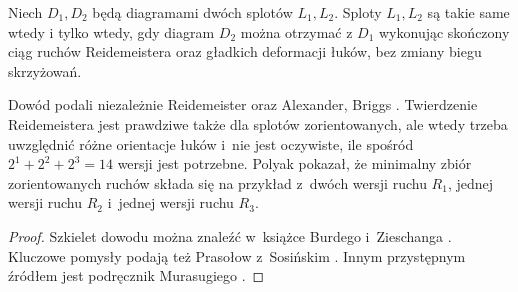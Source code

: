 \begin{theorem}[Reidemeister, 1927]
\label{thm:reidemeister}%
%
%
    Niech $D_1, D_2$ będą diagramami dwóch splotów $L_1, L_2$.
    Sploty $L_1, L_2$ są takie same wtedy i tylko wtedy, gdy diagram $D_2$ można otrzymać z $D_1$ wykonując skończony ciąg ruchów Reidemeistera oraz gładkich deformacji łuków, bez zmiany biegu skrzyżowań.
\end{theorem}

Dowód podali niezależnie Reidemeister \cite{reidemeister1927} oraz Alexander, Briggs \cite{alexander1927}.
%
%
%
Twierdzenie Reidemeistera jest prawdziwe także dla splotów zorientowanych, ale wtedy trzeba uwzględnić różne orientacje łuków i~nie jest oczywiste, ile spośród $2^1 + 2^2 + 2^3 = 14$ wersji jest potrzebne.
Polyak \cite{polyak2010} pokazał, że minimalny zbiór zorientowanych ruchów składa się na przykład z~dwóch wersji ruchu $R_1$, jednej wersji ruchu $R_2$ i~jednej wersji ruchu $R_3$.
%

\begin{proof}
%
%
%
%
%
    Szkielet dowodu można znaleźć w~książce Burdego i~Zieschanga \cite[s. 9-11]{burde2014}.
    Kluczowe pomysły podają też Prasołow z~Sosińskim \cite[s. 11-12]{prasolov1997}.
    Innym przystępnym źródłem jest podręcznik Murasugiego \cite[s. 50-56]{murasugi1996}.
\end{proof}

